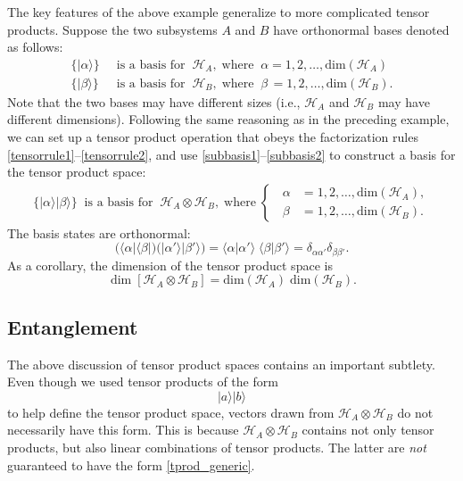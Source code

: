 \documentclass[prx,12pt]{revtex4-2}
\begin{document}
The key features of the above example generalize to more complicated
tensor products.  Suppose the two subsystems $A$ and $B$ have
orthonormal bases denoted as follows:
\begin{align}
  \Big\{ |\alpha\rangle \Big\} &\;\;\textrm{is a basis for}\;\; \mathscr{H}_A,
  \;\mathrm{where}\;\; \alpha = 1, 2, \dots, \mathrm{dim}(\mathscr{H}_A)
  \label{subbasis1} \\
  \Big\{ |\beta\rangle \Big\} &\;\; \textrm{is a basis for}\;\; \mathscr{H}_B,
  \;\mathrm{where}\;\; \beta\, = 1, 2, \dots, \mathrm{dim}(\mathscr{H}_B).
  \label{subbasis2}
\end{align}
Note that the two bases may have different sizes (i.e.,
$\mathscr{H}_A$ and $\mathscr{H}_B$ may have different dimensions).
Following the same reasoning as in the preceding example, we can set
up a tensor product operation that obeys the factorization rules
\eqref{tensorrule1}--\eqref{tensorrule2}, and use
\eqref{subbasis1}--\eqref{subbasis2} to construct a basis for the
tensor product space:
\begin{align}
  \Big\{ |\alpha \rangle |\beta \rangle \Big\}
  \;\;\textrm{is a basis for}\;\; \mathscr{H}_A \otimes \mathscr{H}_B,
  \;\mathrm{where}\;
  \begin{cases}
    \;\;\alpha \!\!\!\!&= 1, 2, \dots, \mathrm{dim}(\mathscr{H}_A), \\
    \;\;\beta \!\!\!\!\!&= 1, 2, \dots, \mathrm{dim}(\mathscr{H}_B).
  \end{cases}
\end{align}
The basis states are orthonormal:
\begin{equation}
  \Big(\langle \alpha| \langle \beta|\Big)
  \Big(|\alpha'\rangle |\beta'\rangle\Big)
  = \langle \alpha|\alpha'\rangle \; \langle \beta|\beta'\rangle
  = \delta_{\alpha\alpha'} \delta_{\beta\beta'}.
  \label{innerprod}
\end{equation}
As a corollary, the dimension of the tensor product space is
\begin{equation}
  \dim\left[\mathscr{H}_A \otimes \mathscr{H}_B\right]
  = \mathrm{dim}(\mathscr{H}_A)\; \mathrm{dim}(\mathscr{H}_B).
  \label{tensordim}
\end{equation}

\subsection{Entanglement}
\label{sec:entanglement}

The above discussion of tensor product spaces contains an important
subtlety.  Even though we used tensor products of the form
\begin{equation}
  |a\rangle |b\rangle
  \label{tprod_generic}
\end{equation}
to help define the tensor product space, vectors drawn from
$\mathscr{H}_A \otimes \mathscr{H}_B$ do not necessarily have this
form.  This is because $\mathscr{H}_A \otimes \mathscr{H}_B$ contains
not only tensor products, but also linear combinations of tensor
products.  The latter are \textit{not} guaranteed to have the form
\eqref{tprod_generic}.
\end{document}
